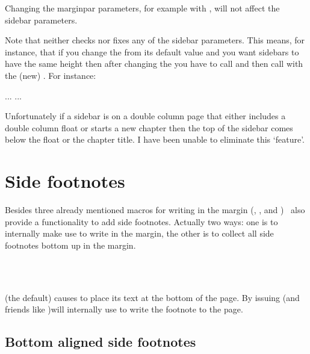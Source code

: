    Changing the marginpar parameters, for example with \cmd{\setmarginnotes},
will not affect the sidebar parameters.

   Note that \cmd{\checkandfixthelayout} neither checks nor fixes any of
the sidebar parameters. This means, for instance, that if you change the
\lnc{\textheight} from its default value and you want sidebars to have 
the same height then after changing the \lnc{\textheight} you have to 
call \cmd{\checkandfixthelayout}  and then call \cmd{\setsidebars} with
the (new) \lnc{\textheight}. For instance:
\begin{lcode}
...
...
\checkandfixthelayout
{}
\end{lcode}

    Unfortunately if a sidebar is on a double column page that either includes
a double column float or starts a new chapter then the top of the sidebar
comes below the float or the chapter title. I have been unable to eliminate 
this `feature'.


\section{Side footnotes}
\label{sec:side-footnotes}

Besides three already mentioned macros for writing in the margin
(\cmd{\marginpar}, \cmd{\sidepar}, and \cmd{\sidebar}) \theclass\ also
provide a functionality to add side footnotes. Actually two ways: one
is to internally make \cmd{\footnote} use \cmd{\marginpar} to write
in the margin, the other is to collect all side footnotes bottom up in
the margin.
\begin{syntax}
  \cmd{\footnotesatfoot}\\
  \cmd{\footnotesinmargin}\\
\end{syntax}
\cmd{\footnotesatfoot} (the default) causes \cmd{\footnote} to place
its text at the bottom of the page. By issuing 
\cmd{\footnote} (and friends like \cmd{\footnotetext})will internally
use \cmd{\marginpar} to write the footnote to the page.



\subsection{Bottom aligned side footnotes}
\label{sec:bottom-aligned-side}

